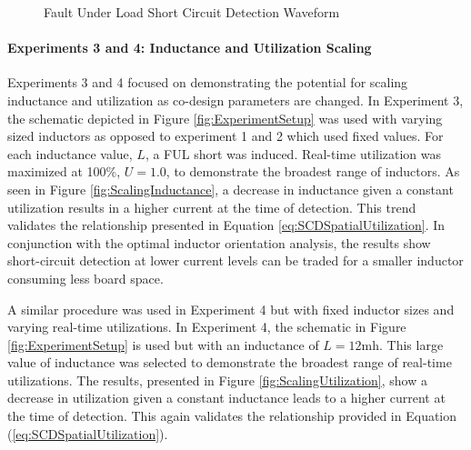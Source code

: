 \begin{figure}
    \centering
    \caption{Fault Under Load Short Circuit Detection Waveform}
    \label{fig:FULShort}
\end{figure}

\paragraph{Experiments 3 and 4: Inductance and Utilization Scaling}
Experiments 3 and 4 focused on demonstrating the potential for scaling inductance and utilization as co-design parameters are changed.
In Experiment 3, the schematic depicted in Figure \ref{fig:ExperimentSetup} was used with varying sized inductors as opposed to experiment 1 and 2 which used fixed values. For each inductance value, $L$, a FUL short was induced. Real-time utilization was maximized at 100\%, $U = 1.0$, to demonstrate the broadest range of inductors. As seen in Figure \ref{fig:ScalingInductance}, a decrease in inductance given a constant utilization results in a higher current at the time of detection. This trend validates the relationship presented in Equation \ref{eq:SCDSpatialUtilization}. In conjunction with the optimal inductor orientation analysis, the results show short-circuit detection at lower current levels can be traded for a smaller inductor consuming less board space.

A similar procedure was used in Experiment 4 but with fixed inductor sizes and varying real-time utilizations. In Experiment 4, the schematic in Figure \ref{fig:ExperimentSetup} is used but with an inductance of $L = 12 \text{mh}$.  This large value of inductance was selected to demonstrate the broadest range of real-time utilizations. The results, presented in Figure \ref{fig:ScalingUtilization}, show a decrease in utilization given a constant inductance leads to a higher current at the time of detection. This again validates the relationship provided in Equation (\ref{eq:SCDSpatialUtilization}).

